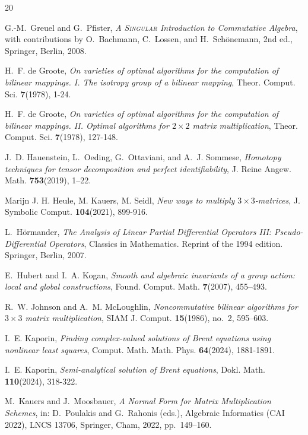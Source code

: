 \documentclass[reqno]{amsart}
\theoremstyle{definition}
\numberwithin{equation}{section}
\theoremstyle{remark}
\begin{document}
\begin{thebibliography}{20}
%

G.-M.~Greuel and G.~Pfister,
\emph{A \textsc{Singular} Introduction to Commutative Algebra},
with contributions by O.~Bachmann, C.~Lossen, and H.~Sch\"onemann,
2nd ed., Springer, Berlin, 2008.


H.~F. de Groote, \textit{On varieties of optimal algorithms for the computation of bilinear mappings. I. The isotropy group of a bilinear mapping}, Theor. Comput. Sci. \textbf{7}(1978), 1-24.


H.~F. de Groote, \textit{On varieties of optimal algorithms for the computation of bilinear mappings. II. Optimal algorithms for $2\times2$ matrix multiplication}, Theor. Comput. Sci. \textbf{7}(1978), 127-148.

J.~D. Hauenstein, L.~Oeding, G.~Ottaviani, and A.~J. Sommese,
\emph{Homotopy techniques for tensor decomposition and perfect identifiability}, J. Reine Angew. Math. \textbf{753}(2019), 1--22.

Marijn J. H. Heule, M. Kauers, M. Seidl,
\textit{New ways to multiply $3\times3$-matrices},
J. Symbolic Comput. \textbf{104}(2021), 899-916.


L.~H\"ormander,
\emph{The Analysis of Linear Partial Differential Operators III:
Pseudo-Differential Operators},
Classics in Mathematics. Reprint of the 1994 edition. Springer, Berlin, 2007.


E.~Hubert and I.~A. Kogan, \emph{Smooth and algebraic invariants of a group action: local and global constructions}, Found. Comput. Math. \textbf{7}(2007), 455--493.

R.~W. Johnson and A.~M. McLoughlin,
\emph{Noncommutative bilinear algorithms for $3\times 3$ matrix multiplication},
SIAM J. Comput. \textbf{15}(1986), no.~2, 595--603.


I.~E. Kaporin, \emph{Finding complex-valued solutions of Brent equations using nonlinear least squares}, Comput. Math. Math. Phys. \textbf{64}(2024), 1881-1891.

I.~E. Kaporin, \emph{Semi-analytical solution of Brent equations},
Dokl. Math. \textbf{110}(2024), 318-322.


M.~Kauers and J.~Moosbauer,
\emph{A Normal Form for Matrix Multiplication Schemes},
in: D.~Poulakis and G.~Rahonis (eds.),
Algebraic Informatics (CAI 2022),
LNCS 13706, Springer, Cham, 2022, pp.~149--160.


\end{thebibliography}
\end{document}
